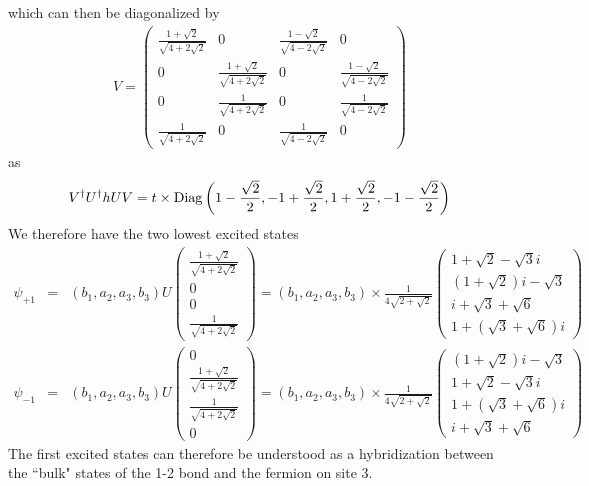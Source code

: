 \documentclass[aps,physrev,amsmath,amssymb]{revtex4-2}
\begin{document}
which can then be diagonalized by
\begin{eqnarray}
	V = \begin{pmatrix}
		\frac{1+ \sqrt{2}}{\sqrt{4+2\sqrt{2}}} & 0 & \frac{1 - \sqrt{2}}{\sqrt{4-2\sqrt{2}}} & 0 \\
		0 & \frac{1 + \sqrt{2}}{\sqrt{4 + 2\sqrt{2}}} & 0 & \frac{1-\sqrt{2}}{\sqrt{4 - 2\sqrt{2}}} \\
		0 & \frac{1}{\sqrt{4+ 2\sqrt{2}}} & 0 & \frac{1}{\sqrt{4 - 2\sqrt{2}}} \\
		\frac{1}{\sqrt{4+2\sqrt{2}}} & 0 & \frac{1}{\sqrt{4-2\sqrt{2}}} & 0
	\end{pmatrix}
\end{eqnarray}
as
\begin{eqnarray}
	V^\dag U^\dag h U V =t\times {\rm Diag}\left( 1 -\frac{\sqrt{2}}{2},  -1 +\frac{\sqrt{2}}{2},  1 +\frac{\sqrt{2}}{2},  -1 -\frac{\sqrt{2}}{2} \right)
\end{eqnarray}
We therefore have the two lowest excited states
\begin{eqnarray}
	\psi_{+1} &=& (b_1,a_2,a_3,b_3) U \begin{pmatrix}
	\frac{1+ \sqrt{2}}{\sqrt{4+2\sqrt{2}}} \\
0  \\
0 \\
\frac{1}{\sqrt{4+2\sqrt{2}}} 
	\end{pmatrix} = (b_1,a_2,a_3,b_3)\times \frac{1}{4\sqrt{2+\sqrt{2}}} \begin{pmatrix}
	1+\sqrt{2}-\sqrt{3} i \\
	(1+\sqrt{2})i-\sqrt{3}  \\
	i+ \sqrt{3} + \sqrt{6} \\
	1 + (\sqrt{3} + \sqrt{6})i
\end{pmatrix} \\\nonumber
	\psi_{-1} &=& (b_1,a_2,a_3,b_3) U \begin{pmatrix}
		0\\
	\frac{1+ \sqrt{2}}{\sqrt{4+2\sqrt{2}}} \\
	\frac{1}{\sqrt{4+2\sqrt{2}}} \\
	0
\end{pmatrix} = (b_1,a_2,a_3,b_3)\times \frac{1}{4\sqrt{2+\sqrt{2}}} \begin{pmatrix}
	(1+\sqrt{2})i-\sqrt{3} \\
	1+\sqrt{2}-\sqrt{3} i \\
	1+ (\sqrt{3} + \sqrt{6} )i\\
    i + \sqrt{3} + \sqrt{6}
\end{pmatrix}
\end{eqnarray}
The first excited states can therefore be understood as a hybridization between the ``bulk" states of the 1-2 bond and the fermion on site 3.  
\end{document}
